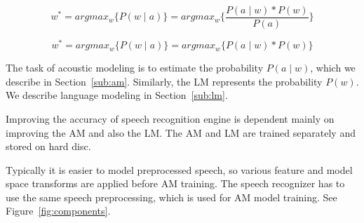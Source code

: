 \begin{equation}\label{eq:best_seq}
    w^* = argmax_{w}\{P(w \mid a)\} = argmax_{w}\{\frac{P(a \mid w) * P(w)}{P(a)}\}
\end{equation}

\begin{equation}\label{eq:best_fix}
    w^* = argmax_{w}\{P(w \mid a)\} = argmax_{w}\{P(a \mid w) * P(w)\}
\end{equation}

The task of acoustic modeling is to estimate the probability $P(a \mid w)$,
which we describe in Section~\ref{sub:am}. 
Similarly, the \ac{LM} represents the probability $P(w)$.
We describe language modeling in Section~\ref{sub:lm}.

Improving the accuracy of speech recognition engine is dependent
mainly on improving the \ac{AM} and also the \ac{LM}.
The \ac{AM} and \ac{LM} are trained separately 
and stored on hard disc.

Typically it is easier to model preprocessed speech, 
so various feature and model space transforms are applied before \ac{AM} training.
The speech recognizer has to use the same speech preprocessing,
which is used for \ac{AM} model training.
See Figure~\ref{fig:components}.


% 


